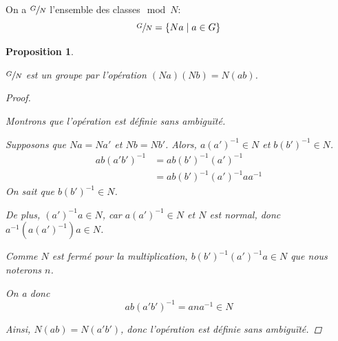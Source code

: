 \documentclass{report}
\newtheorem*{prop}{Proposition}
\theoremstyle{definition}
\theoremstyle{remark}
\begin{document}
	On a $\sfrac{G}{N}$ l'ensemble des classes$\mod N$:
	\begin{equation*}
		\sfrac{G}{N} = \{Na \mid a \in G\}
	\end{equation*}
	\begin{prop}~

		$\sfrac{G}{N}$ est un groupe par l'op\'eration $(Na)(Nb) = N(ab)$.
		\begin{proof}~

			Montrons que l'op\'eration est d\'efinie sans ambigu\"it\'e.

			Supposons que $Na=Na'$ et $Nb=Nb'$. Alors, $a(a')^{-1} \in N$ et $b(b')^{-1} \in N$.
			\begin{align*}
				ab(a'b')^{-1}&= ab(b')^{-1}(a')^{-1}\\
				&= ab(b')^{-1}(a')^{-1}aa^{-1}
			\end{align*}
			On sait que $b(b')^{-1} \in N$.

			De plus, $(a')^{-1}a \in N$, car $a(a')^{-1} \in N$ et $N$ est normal, donc $a^{-1}\left(a(a')^{-1}\right)a \in N$.

			Comme $N$ est ferm\'e pour la multiplication, $b(b')^{-1}(a')^{-1}a \in N$ que nous noterons $n$.

			On a donc
			\begin{equation*}
				ab(a'b')^{-1} = ana^{-1} \in N
			\end{equation*}

			Ainsi, $N(ab) = N(a'b')$, donc l'op\'eration est d\'efinie sans ambigu\"it\'e.


\end{proof}
\end{prop}
\end{document}
